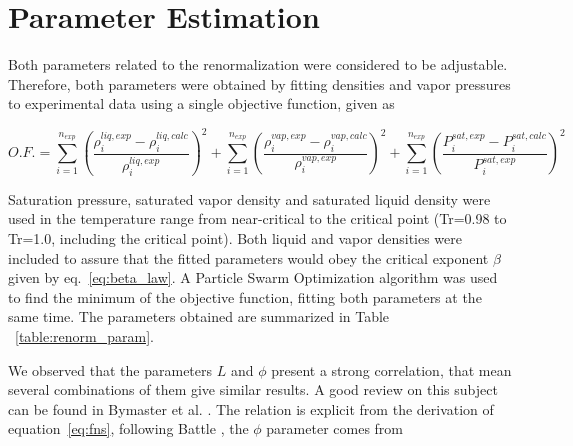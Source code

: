 \documentclass[preprint,12pt,3p]{elsarticle}
\begin{document}
\section{Parameter Estimation}
    Both parameters related to the renormalization were considered to be adjustable. Therefore, both parameters were obtained by fitting densities and vapor pressures to experimental data using a single objective function, given as

\begin{equation}   \label{eq:OF}
O.F.=\sum_{i=1}^{n_{exp}} \left(\frac{\rho_{i}^{liq,exp}-\rho_{i}^{liq,calc}}{\rho_{i}^{liq,exp}}\right)^2 + \sum_{i=1}^{n_{exp}} \left(\frac{\rho_{i}^{vap,exp}-\rho_{i}^{vap,calc}}{\rho_{i}^{vap,exp}}\right)^2 + \sum_{i=1}^{n_{exp}} \left(\frac{P_{i}^{sat,exp}-P_{i}^{sat,calc}}{P_{i}^{sat,exp}}\right)^2
\end{equation}

    Saturation pressure, saturated vapor density and saturated liquid density were used in the temperature range from near-critical to the critical point (Tr=0.98 to Tr=1.0, including the critical point). Both liquid and vapor densities were included to assure that the fitted parameters would obey the critical exponent $\beta$ given by eq.~\ref{eq:beta_law}. A Particle Swarm Optimization algorithm was used to find the minimum of the objective function, fitting both parameters at the same time. The parameters obtained are summarized in Table ~\ref{table:renorm_param}.
    
\begin{table}[ht!]
\centering
\caption{Estimated Parameters for the renormalization method}
\label{table:renorm_param}
\end{table}

	We observed that the parameters $L$ and $\phi$ present a strong correlation, that mean several combinations of them give similar results. A good review on this subject can be found in Bymaster et al. \citep{bymaster2008renormalization}. The relation is explicit from the derivation of equation~\ref{eq:fns}, following Battle \cite{battlerenorm}, the $\phi$ parameter comes from
	
\end{document}
